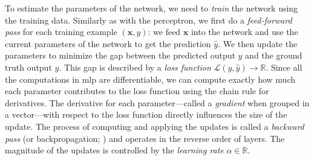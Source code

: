 To estimate the parameters of the network, we need to \emph{train} the network using the training data. Similarly as with the perceptron, we first do a \emph{feed-forward pass} for each training example $(\mathbf{x}, y)$: we feed $\mathbf{x}$ into the network and use the current parameters of the network to get the prediction $\hat{y}$. We then update the parameters to minimize the gap between the predicted output $\hat{y}$ and the ground truth output $y$. This gap is described by a \textit{loss function} $\mathcal{L}(y, \hat{y}) \rightarrow \mathbb{R}$.
Since all the computations in \ac{mlp} are differentiable, we can compute exactly how much each parameter contributes to the loss function using the chain rule for derivatives. The derivative for each parameter---called a \emph{gradient} when grouped in a vector---with respect to the loss function directly influences the size of the update. The process of computing and applying the updates is called a \emph{backward pass} (or backpropagation; \citealp{kelley1960gradient,rumelhart1986learning}) and operates in the reverse order of layers. The magnitude of the updates is controlled by the \emph{learning rate} $\alpha \in \mathbb{R}$.

